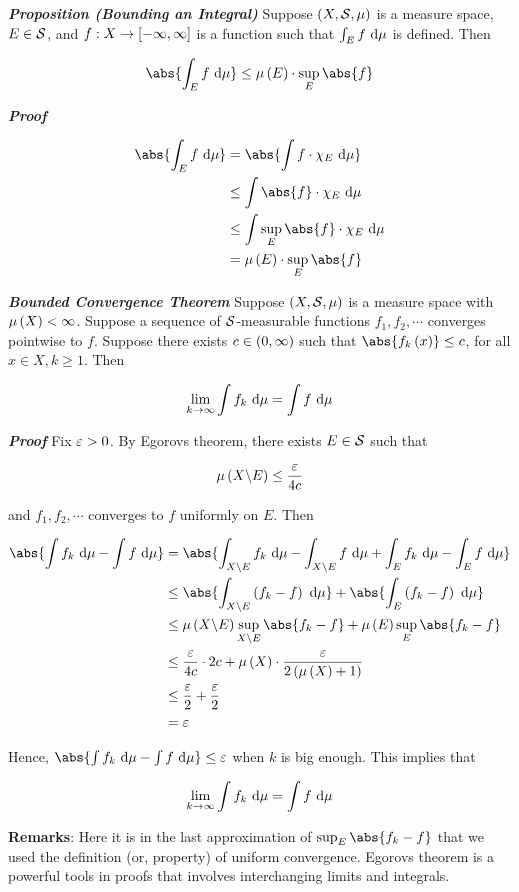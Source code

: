 \documentclass[
]{article}
\begin{document}
\emph{\textbf{Proposition (Bounding an Integral)}} Suppose
\(\pr{X,\S,\mu}\) is a measure space, \(E\in \S\), and
\(f:X\to\br{-\infty,\infty}\) is a function such that \(\int_Ef\dm\) is
defined. Then

\[\abs{\int_Ef\dm}\le \lm{E}\cdot\sup_E\abs{f}\]

\emph{\textbf{Proof}}

\[\ba
\abs{\int_Ef\dm} & = \abs{\int f\cdot\chi_E\dm}\\
& \le \int \abs{f}\cdot\chi_E\dm \\
& \le \int \sup_E\abs{f}\cdot\chi_E\dm\\
& = \lm{E}\cdot\sup_E\abs{f}
\ea\]

\emph{\textbf{Bounded Convergence Theorem}} Suppose \(\pr{X,\S,\mu}\) is
a measure space with \(\lm{X}<\infty\). Suppose a sequence of
\(\S\)-measurable functions \(f_1,f_2,\cdots\) converges pointwise to
\(f\). Suppose there exists \(c\in\pr{0,\infty}\) such that
\(\abs{f_k\pr{x}}\le c\), for all \(x\in X,k\ge 1\). Then

\[\lim_{k\to\infty}\int f_k\dm = \int f\dm\]

\emph{\textbf{Proof}} Fix \(\ve>0\). By Egorov\textquotesingle s
theorem, there exists \(E\in \S\) such that

\[\lm{X\c E}\le \frac{\ve}{4c}\]

and \(f_1,f_2,\cdots\) converges to \(f\) uniformly on \(E\). Then

\[\ba
\abs{\int f_k\dm-\int f\dm} & = \abs{\int_{X\c E}f_k\dm-\int_{X\c E}f\dm+\int_Ef_k\dm-\int_Ef\dm}\\
& \le \abs{\int_{X\c E}\pr{f_k-f}\dm}+\abs{\int_E\pr{f_k-f}\dm}\\
& \le \lm{X\c E}\sup_{X\c E}\abs{f_k-f}+\lm{E}\sup_{E}\abs{f_k-f}\\
& \le \frac{\ve}{4c}\cdot 2c+\lm{X}\cdot \frac{\ve}{2\pr{\lm{X}+1}}\\
& \le \frac{\ve}{2}+\frac{\ve}2\\
& = \ve
\ea\]

Hence, \(\abs{\int f_k\dm-\int f\dm}\le \ve\) when \(k\) is big enough.
This implies that

\[\lim_{k\to \infty}\int f_k\dm = \int f\dm\]

\textbf{Remarks}: Here it is in the last approximation of
\(\sup_{E}\abs{f_k-f}\) that we used the definition (or, property) of
uniform convergence. Egorov\textquotesingle s theorem is a powerful
tools in proofs that involves interchanging limits and integrals.
\end{document}
